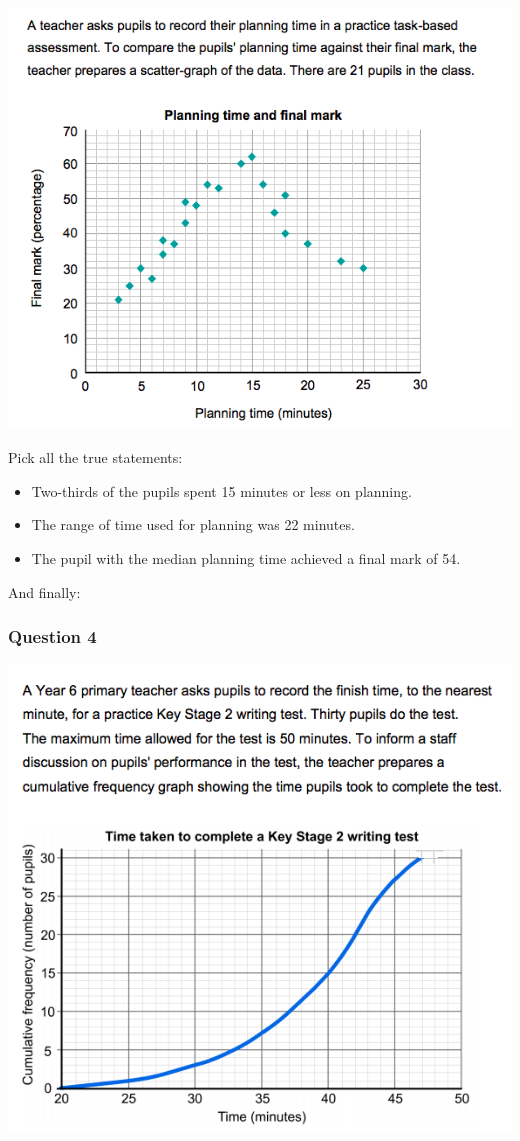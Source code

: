 \documentclass[
]{book}
\providecommand{\tightlist}{%
  \setlength{\itemsep}{0pt}\setlength{\parskip}{0pt}}
\begin{document}
\includegraphics{imgs/numtest_3.png}

Pick all the true statements:

\begin{itemize}
\tightlist
\item
  Two-thirds of the pupils spent 15 minutes or less on planning.
\item
  The range of time used for planning was 22 minutes.
\item
  The pupil with the median planning time achieved a final mark of 54.
\end{itemize}

And finally:

\hypertarget{question-4}{%
\subsubsection*{Question 4}\label{question-4}}

\includegraphics{imgs/numtest_4.png}
\end{document}
